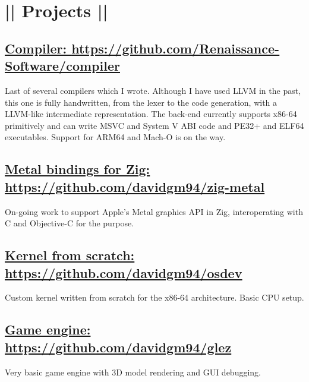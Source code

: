 \section*{|| Projects ||}
	\subsection*{\underline{Compiler: \href{https://github.com/Renaissance-Software/compiler}{https://github.com/Renaissance-Software/compiler}}}
	Last of several compilers which I wrote. Although I have used LLVM in the past, this one is fully handwritten, from the lexer to the code generation, with a LLVM-like intermediate representation. The back-end currently supports x86-64 primitively and can write MSVC and System V ABI code and PE32+ and ELF64 executables. Support for ARM64 and Mach-O is on the way.
	\subsection*{\underline{Metal bindings for Zig: \href{https://github.com/davidgm94/zig-metal}{https://github.com/davidgm94/zig-metal}}}
	On-going work to support Apple's Metal graphics API in Zig, interoperating with C and Objective-C for the purpose.
	\subsection*{\underline{Kernel from scratch: \href{https://github.com/davidgm94/osdev}{https://github.com/davidgm94/osdev}}}
	Custom kernel written from scratch for the x86-64 architecture. Basic CPU setup.
	\subsection*{\underline{Game engine: \href{https://github.com/davidgm94/glez}{https://github.com/davidgm94/glez}}}
	Very basic game engine with 3D model rendering and GUI debugging.